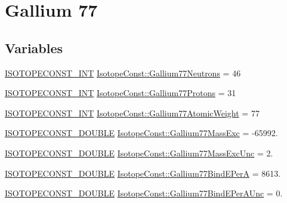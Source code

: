 \hypertarget{group___isotope_const-_gallium-_ga77}{}\section{Gallium 77}
\label{group___isotope_const-_gallium-_ga77}
\subsection*{Variables}
\begin{DoxyCompactItemize}
\item 
\mbox{\hyperlink{group___isotope_const-_macros_ga5f18360b3e99483a35c32d789e62621c}{I\+S\+O\+T\+O\+P\+E\+C\+O\+N\+S\+T\+\_\+\+I\+NT}} \mbox{\hyperlink{group___isotope_const-_gallium-_ga77_ga4455ba6189496b84706a89d3f8851079}{Isotope\+Const\+::\+Gallium77\+Neutrons}} = 46
\item 
\mbox{\hyperlink{group___isotope_const-_macros_ga5f18360b3e99483a35c32d789e62621c}{I\+S\+O\+T\+O\+P\+E\+C\+O\+N\+S\+T\+\_\+\+I\+NT}} \mbox{\hyperlink{group___isotope_const-_gallium-_ga77_ga7ee619949ea9fde2607d29db9204594d}{Isotope\+Const\+::\+Gallium77\+Protons}} = 31
\item 
\mbox{\hyperlink{group___isotope_const-_macros_ga5f18360b3e99483a35c32d789e62621c}{I\+S\+O\+T\+O\+P\+E\+C\+O\+N\+S\+T\+\_\+\+I\+NT}} \mbox{\hyperlink{group___isotope_const-_gallium-_ga77_ga28fc670015a06448704d903a8af04813}{Isotope\+Const\+::\+Gallium77\+Atomic\+Weight}} = 77
\item 
\mbox{\hyperlink{group___isotope_const-_macros_ga8f45a7272ce02c0b4c65c44636ed719a}{I\+S\+O\+T\+O\+P\+E\+C\+O\+N\+S\+T\+\_\+\+D\+O\+U\+B\+LE}} \mbox{\hyperlink{group___isotope_const-_gallium-_ga77_ga943bd321ad7f1b26de570f433af4846b}{Isotope\+Const\+::\+Gallium77\+Mass\+Exc}} = -\/65992.
\item 
\mbox{\hyperlink{group___isotope_const-_macros_ga8f45a7272ce02c0b4c65c44636ed719a}{I\+S\+O\+T\+O\+P\+E\+C\+O\+N\+S\+T\+\_\+\+D\+O\+U\+B\+LE}} \mbox{\hyperlink{group___isotope_const-_gallium-_ga77_ga063bb6cca32265aefdc1af7db370da41}{Isotope\+Const\+::\+Gallium77\+Mass\+Exc\+Unc}} = 2.
\item 
\mbox{\hyperlink{group___isotope_const-_macros_ga8f45a7272ce02c0b4c65c44636ed719a}{I\+S\+O\+T\+O\+P\+E\+C\+O\+N\+S\+T\+\_\+\+D\+O\+U\+B\+LE}} \mbox{\hyperlink{group___isotope_const-_gallium-_ga77_ga1e5ec890c41c557da0ba2d16845a37c8}{Isotope\+Const\+::\+Gallium77\+Bind\+E\+PerA}} = 8613.
\item 
\mbox{\hyperlink{group___isotope_const-_macros_ga8f45a7272ce02c0b4c65c44636ed719a}{I\+S\+O\+T\+O\+P\+E\+C\+O\+N\+S\+T\+\_\+\+D\+O\+U\+B\+LE}} \mbox{\hyperlink{group___isotope_const-_gallium-_ga77_gaaf05027fcda0bbb445be30647436b8e1}{Isotope\+Const\+::\+Gallium77\+Bind\+E\+Per\+A\+Unc}} = 0.

\end{DoxyCompactItemize}
